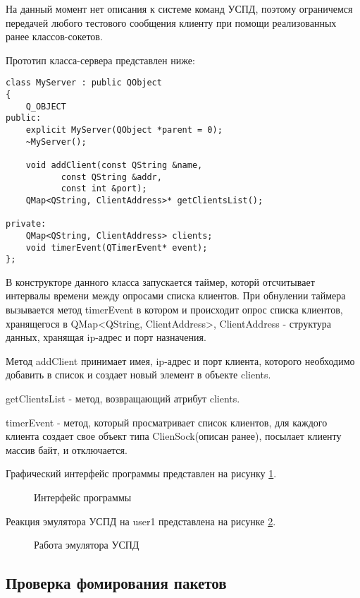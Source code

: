 На данный момент нет описания к системе команд УСПД, поэтому ограничемся передачей любого тестового сообщения клиенту при помощи реализованных ранее классов-сокетов.

Прототип класса-сервера представлен ниже:

\begin{lstlisting}
class MyServer : public QObject
{
    Q_OBJECT
public:
    explicit MyServer(QObject *parent = 0);
    ~MyServer();

    void addClient(const QString &name, 
		   const QString &addr, 
		   const int &port);
    QMap<QString, ClientAddress>* getClientsList();

private:
    QMap<QString, ClientAddress> clients;
    void timerEvent(QTimerEvent* event);
};
\end{lstlisting}

В конструкторе данного класса запускается таймер, которй отсчитывает интервалы времени между опросами списка клиентов. При обнулении таймера вызывается метод timerEvent в котором и происходит опрос списка клиентов, хранящегося в QMap<QString, ClientAddress>, ClientAddress - структура данных, хранящая ip-адрес и порт назначения.

Метод addClient принимает имея, ip-адрес и порт клиента, которого необходимо добавить в список и создает новый элемент в объекте clients.

getClientsList - метод, возвращающий атрибут clients.

timerEvent - метод, который просматривает список клиентов, для каждого клиента создает свое объект типа ClienSock(описан ранее), посылает клиенту массив байт, и отключается. 

Графический интерфейс программы представлен на рисунку \ref{server_gui:server_gui}.

\begin{figure}[ht!]
 \caption{Интерфейс программы}
 \label{server_gui:server_gui}
\end{figure}

Реакция эмулятора УСПД на user1 представлена на рисунке \ref{client_log:client_log}.

\begin{figure}[ht!]
 \caption{Работа эмулятора УСПД}
 \label{client_log:client_log}
\end{figure}

\subsection{Проверка фомирования пакетов}

